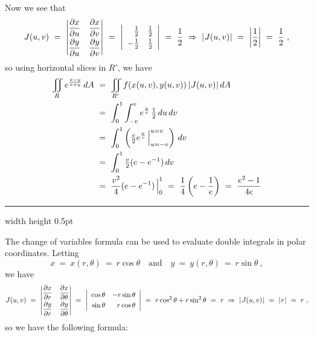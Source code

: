 \begin{exmp}
 Now we see that
 \begin{displaymath}
  J(u,v) ~=~
   \begin{vmatrix}
    \dfrac{\partial x}{\partial u} & \dfrac{\partial x}{\partial v}\smallskip\\
    \dfrac{\partial y}{\partial u} & \dfrac{\partial y}{\partial v}
   \end{vmatrix} ~=~
   \left| \begin{array}{rr}
    \tfrac{1}{2} & \tfrac{1}{2}\smallskip\\
    -\tfrac{1}{2} & \tfrac{1}{2}
   \end{array}\right| ~=~ \frac{1}{2} ~\Rightarrow~ \abs{J(u,v)} ~=~ \left| \frac{1}{2} \right| ~=~ \frac{1}{2} ~,
 \end{displaymath}
 so using horizontal slices in $R'$, we have
 \begin{align*}
  \iint\limits_{R} e^{\frac{x-y}{x+y}} \,dA ~&=~ \iint\limits_{R'} f(x(u,v),y(u,v))\,\lvert\mspace{1mu}J(u,v)\mspace{1mu}\rvert\,dA\\
  &=~ \int_0^1 \int_{-v}^v e^{\frac{u}{v}} \, \tfrac{1}{2}\,du\,dv\\
  &=~ \int_0^1 \left( \tfrac{v}{2} e^{\frac{u}{v}} \,\Big|_{u=-v}^{u=v} \right) \,dv\\
  &=~ \int_0^1 \tfrac{v}{2} (e - e^{-1})\,dv\\
  &=~ \frac{v^2}{4} (e - e^{-1}) \,\Big|_{0}^{1} ~=~ \frac{1}{4} \left( e - \frac{1}{e} \right) ~=~ \frac{e^2 - 1}{4e}
 \end{align*}
\end{exmp}
\hrule width \textwidth height 0.5pt

\medskip

The change of variables formula can be used to evaluate double integrals in polar coordinates. Letting
\begin{displaymath}
 x ~=~ x(r,\theta) ~=~ r\cos \theta \quad \text{and} \quad y ~=~ y(r,\theta) ~=~ r\sin \theta ~,
\end{displaymath}
we have
\begin{displaymath}
 J(u,v) ~=~
  \begin{vmatrix}
   \dfrac{\partial x}{\partial r} & \dfrac{\partial x}{\partial \theta}\smallskip\\
   \dfrac{\partial y}{\partial r} & \dfrac{\partial y}{\partial \theta}
  \end{vmatrix} ~=~
  \left| \begin{array}{rr}
   \cos \theta & -r\sin \theta\smallskip\\
   \sin \theta & r\cos \theta
  \end{array}\right| ~=~ r\cos^2 \theta + r\sin^2 \theta ~=~ r ~\Rightarrow~ \abs{J(u,v)} ~=~ \abs{r} ~=~ r ~,
\end{displaymath}
so we have the following formula:

